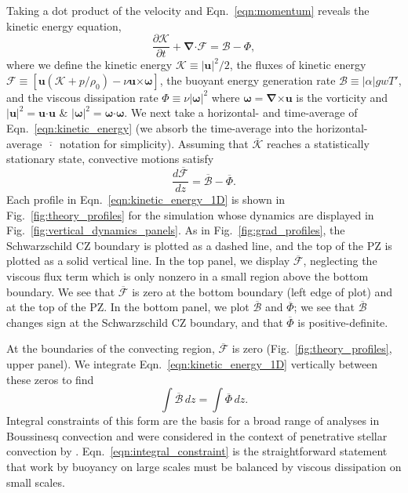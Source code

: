 \documentclass[twocolumn]{aastex631}
\renewcommand{\vec}[1]{\boldsymbol{#1}}
\renewcommand{\dot}{\vec{\cdot}}
\renewcommand{\bar}[1]{\overline{#1}}
\newcommand{\grad}{\vec{\nabla}}
\newcommand{\cross}{\vec{\times}}
\begin{document}
Taking a dot product of the velocity and Eqn.~\ref{eqn:momentum} reveals the kinetic energy equation,
\begin{equation}
\frac{\partial \mathcal{K}}{\partial t}
+ \grad\dot\mathcal{F}
= \mathcal{B} - \Phi,
\label{eqn:kinetic_energy}
\end{equation}
where we define the kinetic energy $\mathcal{K} \equiv |\vec{u}|^2/2$, the fluxes of kinetic energy $\mathcal{F} \equiv \left[\vec{u}(\mathcal{K} + p/\rho_0) - \nu\vec{u}\cross\vec{\omega} \right]$, the buoyant energy generation rate $\mathcal{B} \equiv |\alpha| g w T'$, and the viscous dissipation rate $\Phi \equiv \nu |\vec{\omega}|^2$ where $\vec{\omega} = \grad\cross\vec{u}$ is the vorticity and $|\vec{u}|^2 = \vec{u}\dot\vec{u}$ \& $|\vec{\omega}|^2 = \vec{\omega}\dot\vec{\omega}$.
We next take a horizontal- and time-average of Eqn.~\ref{eqn:kinetic_energy} (we absorb the time-average into the horizontal-average $\bar{\,\cdot\,}$ notation for simplicity).
Assuming that $\bar{\mathcal{K}}$ reaches a statistically stationary state, convective motions satisfy
\begin{equation}
\frac{d\bar{\mathcal{F}}}{dz} = \bar{\mathcal{B}} - \bar{\Phi}.
\label{eqn:kinetic_energy_1D}
\end{equation}
Each profile in Eqn.~\ref{eqn:kinetic_energy_1D} is shown in Fig.~\ref{fig:theory_profiles} for the simulation whose dynamics are displayed in Fig.~\ref{fig:vertical_dynamics_panels}.
As in Fig.~\ref{fig:grad_profiles}, the Schwarzschild CZ boundary is plotted as a dashed line, and the top of the PZ is plotted as a solid vertical line.
In the top panel, we display $\bar{\mathcal{F}}$, neglecting the viscous flux term which is only nonzero in a small region above the bottom boundary.
We see that $\bar{\mathcal{F}}$ is zero at the bottom boundary (left edge of plot) and at the top of the PZ.
In the bottom panel, we plot $\bar{\mathcal{B}}$ and $\bar{\Phi}$; we see that $\bar{\mathcal{B}}$ changes sign at the Schwarzschild CZ boundary, and that $\bar{\Phi}$ is positive-definite.

At the boundaries of the convecting region, $\bar{\mathcal{F}}$ is zero (Fig.~\ref{fig:theory_profiles}, upper panel).
We integrate Eqn.~\ref{eqn:kinetic_energy_1D} vertically between these zeros to find
\begin{equation}
\int \bar{\mathcal{B}}\,dz = \int \bar{\Phi}\,dz.
\label{eqn:integral_constraint}
\end{equation}
Integral constraints of this form are the basis for a broad range of analyses in Boussinesq convection \citep[see e.g.,][]{ahlers_etal_2009, goluskin2016} and were considered in the context of penetrative stellar convection by \citet{roxburgh1989}.
Eqn.~\ref{eqn:integral_constraint} is the straightforward statement that work by buoyancy on large scales must be balanced by viscous dissipation on small scales.
\end{document}

